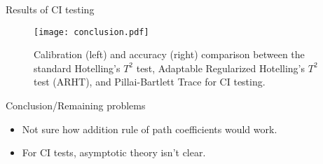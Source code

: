 \documentclass{beamer}
\begin{document}
\begin{frame}{Results of CI testing}
	\begin{figure}
		\centering
		\texttt{[image: conclusion.pdf]}
		\caption{Calibration (left) and accuracy (right) comparison between the
		standard Hotelling's $ T^2 $ test, Adaptable Regularized Hotelling's $
		T^2 $ test (ARHT), and Pillai-Bartlett Trace for CI testing.}
		\label{fig:conc_compare}
	\end{figure}
\end{frame}

\begin{frame}{Conclusion/Remaining problems}
	\begin{itemize}
		\item Not sure how addition rule of path coefficients would work.
		\item For CI tests, asymptotic theory isn't clear.
	\end{itemize}
\end{frame}
\end{document}
